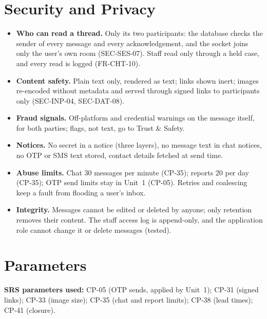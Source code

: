 \documentclass[11pt,a4paper]{article}
\begin{document}
\section{Security and Privacy}
\begin{itemize}[nosep]
  \item \textbf{Who can read a thread.} Only its two participants: the database checks the sender of every message and every acknowledgement, and the socket joins only the user's own room (SEC-SES-07). Staff read only through a held case, and every read is logged (FR-CHT-10).
  \item \textbf{Content safety.} Plain text only, rendered as text; links shown inert; images re-encoded without metadata and served through signed links to participants only (SEC-INP-04, SEC-DAT-08).
  \item \textbf{Fraud signals.} Off-platform and credential warnings on the message itself, for both parties; flags, not text, go to Trust \& Safety.
  \item \textbf{Notices.} No secret in a notice (three layers), no message text in chat notices, no OTP or SMS text stored, contact details fetched at send time.
  \item \textbf{Abuse limits.} Chat 30 messages per minute (CP-35); reports 20 per day (CP-35); OTP send limits stay in Unit~1 (CP-05). Retries and coalescing keep a fault from flooding a user's inbox.
  \item \textbf{Integrity.} Messages cannot be edited or deleted by anyone; only retention removes their content. The staff access log is append-only, and the application role cannot change it or delete messages (tested).
\end{itemize}

\section{Parameters}
\textbf{SRS parameters used:} CP-05 (OTP sends, applied by Unit~1); CP-31 (signed links); CP-33 (image size); CP-35 (chat and report limits); CP-38 (lead times); CP-41 (closure).
\end{document}
